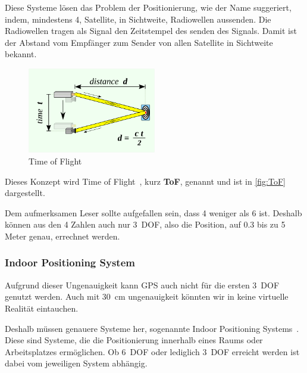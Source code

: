         Diese Systeme lösen das Problem der Positionierung, wie der Name suggeriert, indem, mindestens 4, Satellite, in Sichtweite, Radiowellen aussenden.
        Die Radiowellen tragen als Signal den Zeitstempel des senden des Signals.
        Damit ist der Abstand vom Empfänger zum Sender von allen Satellite in Sichtweite bekannt.

        \begin{figure}[ht!]
            \center
            \includegraphics[width={0.5\textwidth}]{../assets/img/time_of_flight}
            \caption{Time of Flight~\autocite{wikipedia-contributors-2023D}}
            \label{fig:ToF}
        \end{figure}

        Dieses Konzept wird Time of Flight~\autocite{wikipedia-contributors-2023D}, kurz \textbf{ToF}, genannt und ist in \autoref{fig:ToF} dargestellt.

        Dem aufmerksamen Leser sollte aufgefallen sein, dass 4 weniger als 6 ist.
        Deshalb können aus den 4 Zahlen auch nur 3~DOF, also die Position, auf 0.3 bis zu 5 Meter genau, errechnet werden.

    \subsubsection{Indoor Positioning System}\label{subsubsec:indoor-positioning-system}
        Aufgrund dieser Ungenauigkeit kann GPS auch nicht für die ersten 3~DOF genutzt werden.
        Auch mit 30~cm ungenauigkeit könnten wir in keine virtuelle Realität eintauchen.

        Deshalb müssen genauere Systeme her, sogenannte Indoor Positioning Systems~\autocite{wikipedia-contributors-2023E}.
        Diese sind Systeme, die die Positionierung innerhalb eines Raums oder Arbeitsplatzes ermöglichen.
        Ob 6~DOF oder lediglich 3~DOF erreicht werden ist dabei vom jeweiligen System abhängig.

